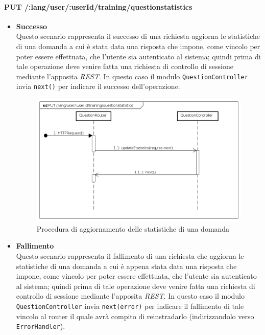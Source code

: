 \paragraph{PUT /:lang/user/:userId/training/questionstatistics} %
\begin{itemize}
\item \textbf{Successo}\\
Questo scenario rappresenta il successo di una richiesta aggiorna le statistiche di una domanda a cui è stata data una risposta che impone, come vincolo per poter essere effettuata, che l'utente sia autenticato al sistema; quindi prima di tale operazione deve venire fatta una richiesta di controllo di sessione mediante l'apposita \textit{REST}. In questo caso il modulo \texttt{QuestionController} invia \texttt{next()} per indicare il successo dell'operazione.

\begin{figure}[ht]
	\centering
	\includegraphics[scale=0.45]{UML/DiagrammiDiSequenza/Back-end/PUT__lang_user__userId_training_questionstatistics_success.png}
	\caption{Procedura di aggiornamento delle statistiche di una domanda}
\end{figure}
\FloatBarrier

\item \textbf{Fallimento}\\
Questo scenario rappresenta il fallimento di una richiesta che aggiorna le statistiche di una domanda a cui è appena stata data una risposta che impone, come vincolo per poter essere effettuata, che l'utente sia autenticato al sistema; quindi prima di tale operazione deve venire fatta una richiesta di controllo di sessione mediante l'apposita \textit{REST}. In questo caso il modulo \texttt{QuestionController} invia \texttt{next(error)} per indicare il fallimento di tale vincolo al router il quale avrà compito di reinstradarlo (indirizzandolo verso \texttt{ErrorHandler}).


\end{itemize}
